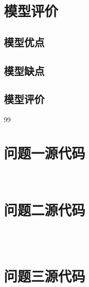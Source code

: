 \documentclass[withoutpreface,bwprint]{cumcmthesis}
\begin{document}
\section{模型评价}
\subsection {模型优点}


\subsection {模型缺点}


\subsection{模型评价}






\newpage
\begin{thebibliography}{99}
        
\end{thebibliography}



\newpage
\begin{appendices}


\section{问题一源代码}
\begin{lstlisting}[language=lingo]


\end{lstlisting}


\section{问题二源代码}
\begin{lstlisting}[language=lingo]

  
\end{lstlisting}

\section{问题三源代码}
\begin{lstlisting}[language=lingo]

\end{lstlisting}

\begin{lstlisting}[language=python]



\end{lstlisting}
\end{appendices}
\end{document}
